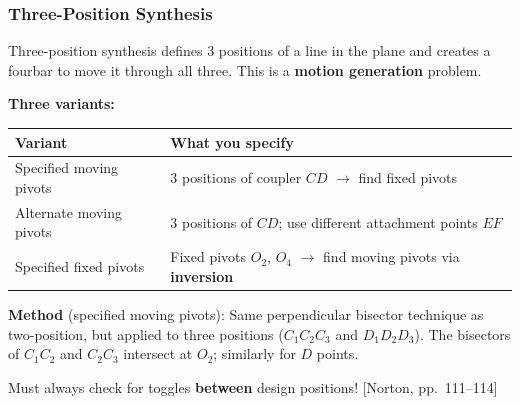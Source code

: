 \documentclass[10pt,aspectratio=43]{beamer}
\newcommand{\pref}[1]{\vfill\hfill{\scriptsize\color{gray}[Norton, pp.~#1]}}
\begin{document}

\begin{frame}
\frametitle{Three-Position Synthesis}

Three-position synthesis defines 3 positions of a line in the plane and creates a fourbar to move it through all three. This is a \textbf{motion generation} problem.

\vspace{4pt}
\textbf{Three variants:}

\begin{center}
\small
\begin{tabular}{l|l}
\toprule
\textbf{Variant} & \textbf{What you specify} \\
\midrule
Specified moving pivots & 3 positions of coupler $CD$ $\to$ find fixed pivots \\
Alternate moving pivots & 3 positions of $CD$; use different attachment points $EF$ \\
Specified fixed pivots & Fixed pivots $O_2$, $O_4$ $\to$ find moving pivots via \textbf{inversion} \\
\bottomrule
\end{tabular}
\end{center}

\vspace{4pt}
\textbf{Method} (specified moving pivots): Same perpendicular bisector technique as two-position, but applied to three positions ($C_1C_2C_3$ and $D_1D_2D_3$). The bisectors of $C_1C_2$ and $C_2C_3$ intersect at $O_2$; similarly for $D$ points.

\vspace{4pt}
Must always check for toggles \textbf{between} design positions!
\pref{111--114}
\end{frame}
\end{document}
